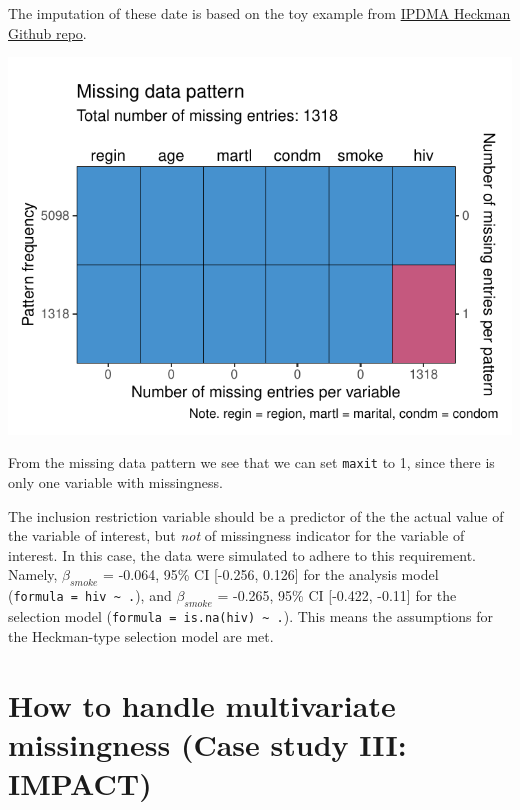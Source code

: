 \documentclass[
]{jss}
\begin{document}
The imputation of these date is based on the toy example from
\href{https://github.com/johamunoz/Heckman-IPDMA/blob/main/Toy_example.R}{IPDMA
Heckman Github repo}.

\begin{CodeChunk}


\begin{center}\includegraphics{Manuscript_files/figure-latex/hiv-1} \end{center}

\end{CodeChunk}

From the missing data pattern we see that we can set \texttt{maxit} to
1, since there is only one variable with missingness.

The inclusion restriction variable should be a predictor of the the
actual value of the variable of interest, but \emph{not} of missingness
indicator for the variable of interest. In this case, the data were
simulated to adhere to this requirement. Namely, \(\beta_{smoke}\) =
-0.064, 95\% CI {[}-0.256, 0.126{]} for the analysis model
(\texttt{formula\ =\ hiv\ \textasciitilde{}\ .}), and \(\beta_{smoke}\)
= -0.265, 95\% CI {[}-0.422, -0.11{]} for the selection model
(\texttt{formula\ =\ is.na(hiv)\ \textasciitilde{}\ .}). This means the
assumptions for the Heckman-type selection model are met.

\hypertarget{how-to-handle-multivariate-missingness-case-study-iii-impact}{%
\section{How to handle multivariate missingness (Case study III:
IMPACT)}\label{how-to-handle-multivariate-missingness-case-study-iii-impact}}
\end{document}
